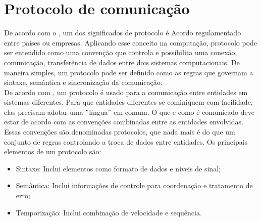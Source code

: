 \section{Protocolo de comunicação}
De acordo com o , um dos significados de protocolo é Acordo 
regulamentado entre países ou empresas. Aplicando esse conceito na computação, 
protocolo pode ser entendido como uma convenção que controla e possibilita uma 
conexão, comunicação, transferência de dados entre dois sistemas 
computacionais. De maneira simples, um protocolo pode ser definido como as 
regras que governam a sintaxe, semântica e sincronização da comunicação.\\
De acordo com , um protocolo é usado para a 
comunicação entre entidades em sistemas diferentes. Para que entidades 
diferentes se cominiquem com facilidade, elas precisam adotar uma ¨língua¨ em 
comum. O que e como é comunicado deve estar de acordo com as convenções 
combinadas entre as entidades envolvidas. Essas convenções são denominadas 
protocolos, que nada mais é do que um conjunto de regras controlando a troca de 
dados entre entidades. Os principais elementos de um protocolo são:
\begin{itemize}
	\item Sintaxe: Inclui elementos como formato de dados e níveis de sinal;
	\item Semântica: Inclui informações de controle para coordenação e 
	tratamento de erro;
	\item Temporização: Inclui combinação de velocidade e sequência.
\end{itemize}
